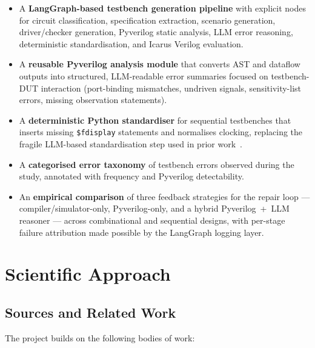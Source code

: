 \documentclass[11pt,a4paper, titlepage=false]{scrreprt}
\begin{document}
\begin{itemize}
    \item A \textbf{LangGraph-based testbench generation pipeline} with explicit nodes for
    circuit classification, specification extraction, scenario generation, driver/checker
    generation, Pyverilog static analysis, LLM error reasoning, deterministic standardisation,
    and Icarus Verilog evaluation.

    \item A \textbf{reusable Pyverilog analysis module} that converts AST and dataflow outputs
    into structured, LLM-readable error summaries focused on testbench-DUT interaction
    (port-binding mismatches, undriven signals, sensitivity-list errors, missing observation
    statements).

    \item A \textbf{deterministic Python standardiser} for sequential testbenches that inserts
    missing \texttt{\$fdisplay} statements and normalises clocking, replacing the fragile
    LLM-based standardisation step used in prior work~\cite{qiu2024autobench}.

    \item A \textbf{categorised error taxonomy} of testbench errors observed during the study,
    annotated with frequency and Pyverilog detectability.

    \item An \textbf{empirical comparison} of three feedback strategies for the repair loop ---
    compiler/simulator-only, Pyverilog-only, and a hybrid Pyverilog~+~LLM reasoner --- across
    combinational and sequential designs, with per-stage failure attribution made possible by
    the LangGraph logging layer.
\end{itemize}


\section*{Scientific Approach}

\subsection*{Sources and Related Work}

The project builds on the following bodies of work:
\end{document}
